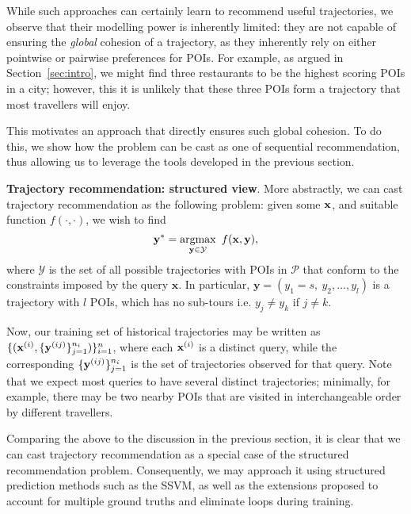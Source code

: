 While such approaches can certainly learn to recommend useful trajectories,
we observe that their modelling power is inherently limited:
they are not capable of ensuring the \emph{global} cohesion of a trajectory,
as they inherently rely on either pointwise or pairwise preferences for POIs.
For example, as argued in Section~\ref{sec:intro},
we might find three restaurants to be the highest scoring POIs in a city;
however, this it is unlikely that these three POIs form a trajectory that most travellers will enjoy.

This motivates an approach that directly ensures such global cohesion.
To do this, we show how the problem can be cast as one of sequential recommendation, 
thus allowing us to leverage the tools developed in the previous section.


%
\textbf{Trajectory recommendation: structured view}.
More abstractly, we can cast trajectory recommendation as the following problem:
given some $\mathbf{x}$, and suitable function $f(\cdot,\cdot)$, we wish to find
\begin{equation*}
\mathbf{y}^* = \operatorname*{argmax}_{\mathbf{y} \in \mathcal{Y}}~f(\mathbf{x}, \mathbf{y}),
\end{equation*}
where $\mathcal{Y}$ is the set of all possible trajectories with POIs in $\mathcal{P}$ that conform to the constraints imposed by the query $\mathbf{x}$.
In particular,
$\mathbf{y} = (y_1 = s,~ y_2, \dots, y_l)$ is a trajectory with $l$ POIs, which has no sub-tours i.e. $y_j \ne y_k$ if $j \ne k$.

Now, our training set of historical trajectories may be written as
$\{ ( \mathbf{x}^{({i})}, \{ \mathbf{y}^{({ij})} \}_{j=1}^{n_i} ) \}_{i=1}^{n}$,
where each $\mathbf{x}^{({i})}$ is a distinct query,
while the corresponding $\{ \mathbf{y}^{({ij})} \}_{j=1}^{n_i}$ is the set of trajectories observed for that query.
Note that we expect most queries to have several distinct trajectories;
minimally,
for example,
there may be two nearby POIs that are visited in interchangeable order by different travellers.

Comparing the above to the discussion in the previous section, it is clear that
we can cast trajectory recommendation as a special case of the structured recommendation problem.
Consequently, we may approach it using structured prediction methods such as the SSVM,
as well as the extensions proposed to account for multiple ground truths and eliminate loops during training.

